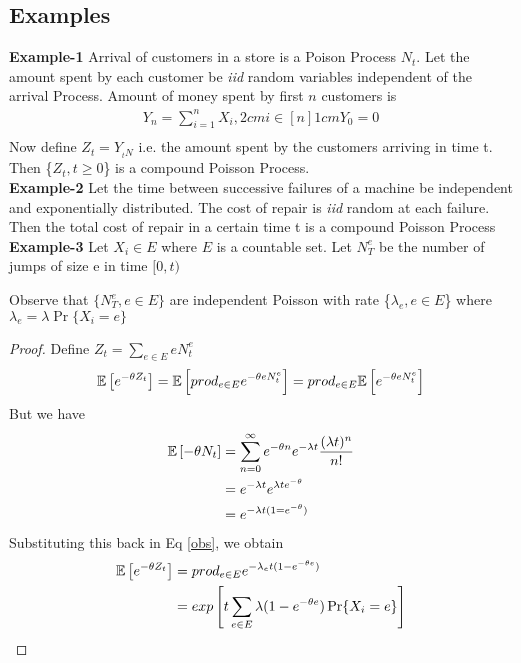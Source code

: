 \documentclass[a4paper,english,10pt]{article}
\begin{document}
\subsection{Examples}
\textbf{Example-1 }Arrival of customers in a store is a Poison Process $N_t
$. Let the amount spent by each customer be \emph{iid} random variables independent of the arrival Process. Amount of money spent by first $n$ customers is
\begin{align}
Y_n=\sum_{i=1}^{n}X_i, {2cm}i \in [n] {1cm}Y_0=0\\
\end{align}
Now define $Z_t=Y_{_tN}$ i.e. the amount spent by the customers arriving in time t. Then \{$Z_t,t\geq 0$\} is a compound Poisson Process.\\

\textbf{Example-2} Let the time between successive failures of a machine be independent and  exponentially distributed. The cost of repair is \emph{iid} random at each failure. Then the total cost of repair in a certain time t is a compound Poisson Process\\

\textbf{Example-3} Let $X_i\in E$ where $E$ is a countable set. Let $N_T^e$  be the number of jumps of size e in time $[0,t)$
\begin{note}
	Observe that $\{N_T^e, e\in E\}$ are independent Poisson with rate \{$\lambda_e, e\in E$\}  where $\lambda_e=\lambda \Pr\{X_i=e\}$
\end{note}
\begin{proof}
	Define $Z_t=\sum_{e\in E}eN_t^e$
	\begin{align}\label{obs}
	\mathbb{E}\left[e^{-\theta Z_t}\right]=\mathbb{E}\left[prod_{e\in E}e^{-\theta e N_t^e}\right]=prod_{e\in E}\mathbb{E}\left[e^{-\theta e N_t^e}\right]
	\end{align}
	But we have
	\begin{align*}
	\mathbb{E}\left[-\theta N_t\right] &= \sum_{n=0}^{\infty}e^{-\theta n}e^{-\lambda t}\frac{(\lambda t)^n}{n!}\\
	&= e^{-\lambda t} e^{\lambda te^{-\theta}}\\
	&= e^{-\lambda t(1=e^{-\theta})}
	\end{align*}
	Substituting this back in Eq \ref{obs}, we obtain
		\begin{align*}
		\mathbb{E}\left[e^{-\theta Z_t}\right] &= prod_{e\in E}e^{-\lambda_et(1-e^{-\theta e})}\\
		&= exp\left[t\sum_{e\in E}\lambda(1-e^{-\theta e})\Pr\{X_i=e\}\right]
		\end{align*}
\end{proof}
\end{document}
